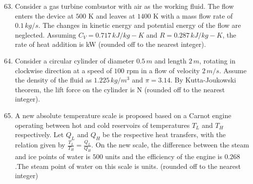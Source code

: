\documentclass[journal]{IEEEtran}
\theoremstyle{remark}
\begin{document}
\begin{enumerate}[itemsep=1em]
\setcounter{enumi}{62}
\item Consider a gas turbine combustor with air as the working fluid. The flow enters the device at $500$ K and leaves at $1400$ K with a mass flow rate of $0.1\,kg/s$. The changes 
in kinetic energy and potential energy of the flow are neglected. Assuming $C_V=0.717 \,kJ/kg-K$ and $R = 0.287\,kJ/kg-K$, the rate of heat addition is \underline{\hspace{1cm}} kW 
(rounded off to the nearest integer). 
\end{enumerate}

\begin{enumerate}[itemsep=1em]
\setcounter{enumi}{63}
\item Consider a circular cylinder of diameter $0.5 \,m$ and length $2\,m$, rotating in clockwise direction at a speed of $100$ rpm in a flow of velocity $2 \,m/s$. Assume the density of the fluid as $1.225\,kg/m^3$ and $\pi= 3.14$. By Kutta-Joukowski theorem, the lift force on the cylinder is \underline{\hspace{2cm}} N (rounded off to the nearest integer). 
\end{enumerate}

\begin{enumerate}[itemsep=1em]
\setcounter{enumi}{64}
\item A new absolute temperature scale is proposed based on a Carnot engine operating between hot and cold reservoirs of temperatures $T_L$ and $T_H$ respectively. Let $Q_L$ and  
$Q_H$ be the respective heat transfers, with the relation given by $\frac{T_L}{T_H}=\frac{Q_L}{Q_H}$. On the new scale, the difference between the steam and ice points of water is $500$ units and the efficiency of the engine is $0.268$.The steam point of water on this scale is \underline{\hspace{1cm}} units.
(rounded off to the nearest integer)
\end{enumerate}
\end{document}
